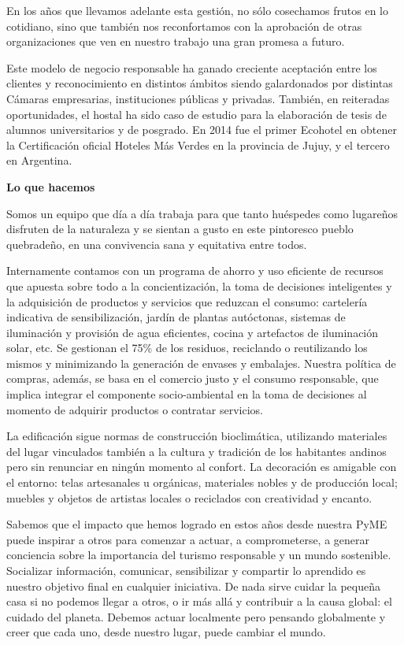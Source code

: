 \begin{fullwidth}
En los años que llevamos adelante esta gestión, no sólo cosechamos
frutos en lo cotidiano, sino que también nos reconfortamos con la
aprobación de otras organizaciones que ven en nuestro trabajo una gran
promesa a futuro.

Este modelo de negocio responsable ha ganado creciente aceptación entre
los clientes y reconocimiento en distintos ámbitos siendo galardonados
por distintas Cámaras empresarias, instituciones públicas y privadas.
También, en reiteradas oportunidades, el hostal ha sido caso de estudio
para la elaboración de tesis de alumnos universitarios y de posgrado. En
2014 fue el primer Ecohotel en obtener la Certificación oficial Hoteles
Más Verdes en la provincia de Jujuy, y el tercero en Argentina.

\textbf{Lo que hacemos}

Somos un equipo que día a día trabaja para que tanto huéspedes como
lugareños disfruten de la naturaleza y se sientan a gusto en este
pintoresco pueblo quebradeño, en una convivencia sana y equitativa entre
todos.

Internamente contamos con un programa de ahorro y uso eficiente de
recursos que apuesta sobre todo a la concientización, la toma de
decisiones inteligentes y la adquisición de productos y servicios que
reduzcan el consumo: cartelería indicativa de sensibilización, jardín de
plantas autóctonas, sistemas de iluminación y provisión de agua
eficientes, cocina y artefactos de iluminación solar, etc. Se gestionan
el 75\% de los residuos, reciclando o reutilizando los mismos y
minimizando la generación de envases y embalajes. Nuestra política de
compras, además, se basa en el comercio justo y el consumo responsable,
que implica integrar el componente socio-ambiental en la toma de
decisiones al momento de adquirir productos o contratar servicios.

La edificación sigue normas de construcción bioclimática, utilizando
materiales del lugar vinculados también a la cultura y tradición de los
habitantes andinos pero sin renunciar en ningún momento al confort. La
decoración es amigable con el entorno: telas artesanales u orgánicas,
materiales nobles y de producción local; muebles y objetos de artistas
locales o reciclados con creatividad y encanto.

Sabemos que el impacto que hemos logrado en estos años desde nuestra
PyME puede inspirar a otros para comenzar a actuar, a comprometerse, a
generar conciencia sobre la importancia del turismo responsable y un
mundo sostenible. Socializar información, comunicar, sensibilizar y
compartir lo aprendido es nuestro objetivo final en cualquier
iniciativa. De nada sirve cuidar la pequeña casa si no podemos llegar a
otros, o ir más allá y contribuir a la causa global: el cuidado del
planeta. Debemos actuar localmente pero pensando globalmente y creer que
cada uno, desde nuestro lugar, puede cambiar el mundo.


\end{fullwidth}
